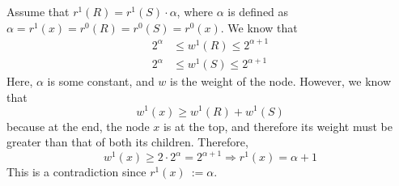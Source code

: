 \documentclass[10pt]{article}
\begin{document}
Assume that $r^1(R) = r^1(S) \cdot \alpha$, where $\alpha$ is defined as $\alpha = r^1(x) = r^0(R) = r^0(S) = r^0(x)$.  We know that
\begin{align*}
    2^\alpha &\leq w^1(R) \leq 2^{\alpha + 1} \\
    2^\alpha &\leq w^1(S) \leq 2^{\alpha + 1}
\end{align*}
Here, $\alpha$ is some constant, and $w$ is the weight of the node.  However, we know that
\[w^1(x) \geq w^1(R) + w^1(S)\]
because at the end, the node $x$ is at the top, and therefore its weight must be greater than that of both its children.  Therefore,
\[w^1(x) \geq 2 \cdot 2^\alpha = 2^{\alpha + 1} \Rightarrow r^1(x) = \alpha + 1\]
This is a contradiction since $r^1(x) \::= \alpha$.
\end{document}
